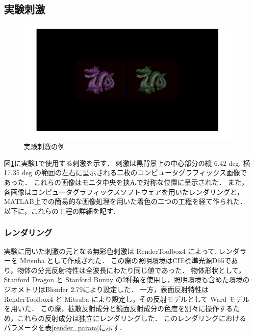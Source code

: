     \subsection{実験刺激}

        \begin{figure}[h]
            \centering
            \includegraphics[width=14.0cm]{./img/ex1_stimuli.png}
            \caption{実験刺激の例}
            \label{ex1_stimuli}
        \end{figure}

        図\ref{ex1_stimuli}に実験1で使用する刺激を示す．
        刺激は黒背景上の中心部分の縦 6.42 deg, 横 17.35 deg の範囲の左右に呈示される二枚のコンピュータグラフィックス画像であった．
        これらの画像はモニタ中央を挟んで対称な位置に呈示された．
        また，各画像はコンピュータグラフィックスソフトウェアを用いたレンダリングと，MATLAB上での簡易的な画像処理を用いた着色の二つの工程を経て作られた．
        以下に，これらの工程の詳細を記す．

        \subsubsection{レンダリング}

            実験に用いた刺激の元となる無彩色刺激は RenderToolbox4 によって, レンダラーを Mitsuba\cite{Mitsuba} として作成された．
            この際の照明環境はCIE標準光源D65であり，物体の分光反射特性は全波長にわたり同じ値であった．
            物体形状として，Stanford Dragon と Stanford Bunny \cite{StanfordModels} の2種類を使用し，照明環境も含めた環境のジオメトリはBlender 2.79により設定した．
            一方，表面反射特性は RenderToolbox4 と Mitsuba により設定し，その反射モデルとして Ward モデル\cite{Ward}を用いた．
            この際，拡散反射成分と鏡面反射成分の色度を別々に操作するため，これらの反射成分は独立にレンダリングした．
            このレンダリングにおけるパラメータを表\ref{render_param}に示す．


